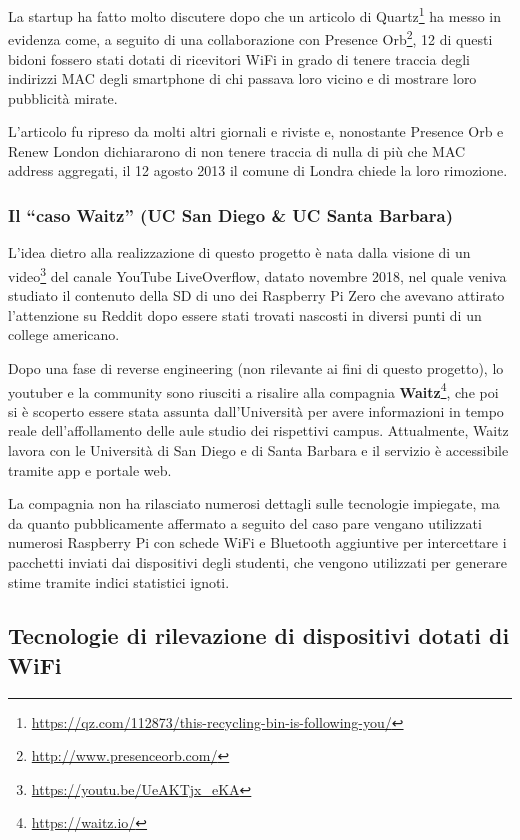La startup ha fatto molto discutere dopo che un articolo di Quartz\footnote{\url{https://qz.com/112873/this-recycling-bin-is-following-you/}} %
ha messo in evidenza come, a seguito di una collaborazione con Presence Orb\footnote{\url{http://www.presenceorb.com/}},
12 di questi bidoni fossero stati dotati di ricevitori WiFi in grado di tenere traccia degli indirizzi MAC degli smartphone di chi passava loro vicino e di mostrare loro pubblicità mirate.

L'articolo fu ripreso da molti altri giornali e riviste e, nonostante Presence Orb e Renew London dichiararono di non tenere traccia di nulla di più che MAC address aggregati, il 12 agosto 2013 il comune di Londra chiede la loro rimozione.

\subsubsection[Il ``caso Waitz'']{Il ``caso Waitz'' (UC San Diego \& UC Santa Barbara)}

L'idea dietro alla realizzazione di questo progetto è nata dalla visione di un video\footnote{\url{https://youtu.be/UeAKTjx_eKA}} del canale YouTube LiveOverflow, datato novembre 2018,
nel quale veniva studiato il contenuto della SD di uno dei Raspberry Pi Zero che avevano attirato l'attenzione su Reddit dopo essere stati trovati nascosti in diversi punti di un college americano.

Dopo una fase di reverse engineering (non rilevante ai fini di questo progetto), lo youtuber e la community sono riusciti a risalire alla compagnia \textbf{Waitz}\footnote{\url{https://waitz.io/}}, %
che poi si è scoperto essere stata assunta dall'Università per avere informazioni in tempo reale dell'affollamento delle aule studio dei rispettivi campus.
Attualmente, Waitz lavora con le Università di San Diego e di Santa Barbara e il servizio è accessibile tramite app e portale web.

La compagnia non ha rilasciato numerosi dettagli sulle tecnologie impiegate, ma da quanto pubblicamente affermato a seguito del caso
pare vengano utilizzati numerosi Raspberry Pi con schede WiFi e Bluetooth aggiuntive per intercettare i pacchetti inviati dai dispositivi degli studenti, che vengono utilizzati per generare stime tramite indici statistici ignoti.

\subsection[Tecnologie di rilevazione]{Tecnologie di rilevazione di dispositivi dotati di WiFi}

